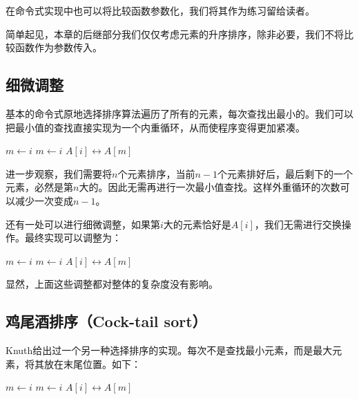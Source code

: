 \documentclass{ctexart}
\begin{document}
在命令式实现中也可以将比较函数参数化，我们将其作为练习留给读者。

简单起见，本章的后继部分我们仅仅考虑元素的升序排序，除非必要，我们不将比较函数作为参数传入。

\subsection{细微调整}

基本的命令式原地选择排序算法遍历了所有的元素，每次查找出最小的。我们可以把最小值的查找直接实现为一个内重循环，从而使程序变得更加紧凑。

\begin{algorithmic}[1]
    \State $m \gets i$
        \State $m \gets i$
      \EndIf
    \EndFor
    \State {} $A[i] \leftrightarrow A[m]$
  \EndFor
\EndProcedure
\end{algorithmic}

进一步观察，我们需要将$n$个元素排序，当前$n-1$个元素排好后，最后剩下的一个元素，必然是第$n$大的。因此无需再进行一次最小值查找。这样外重循环的次数可以减少一次变成$n-1$。

还有一处可以进行细微调整，如果第$i$大的元素恰好是$A[i]$，我们无需进行交换操作。最终实现可以调整为：

\begin{algorithmic}[1]
    \State $m \gets i$
        \State $m \gets i$
      \EndIf
    \EndFor
      \State {} $A[i] \leftrightarrow A[m]$
    \EndIf
  \EndFor
\EndProcedure
\end{algorithmic}

显然，上面这些调整都对整体的复杂度没有影响。

\subsection{鸡尾酒排序（Cock-tail sort）}

Knuth给出过一个另一种选择排序的实现\cite{TAOCP}。每次不是查找最小元素，而是最大元素，将其放在末尾位置。如下：

\begin{algorithmic}[1]
    \State $m \gets i$
        \State $m \gets i$
      \EndIf
    \EndFor
    \State {} $A[i] \leftrightarrow A[m]$
  \EndFor
\EndProcedure
\end{algorithmic}
\end{document}
